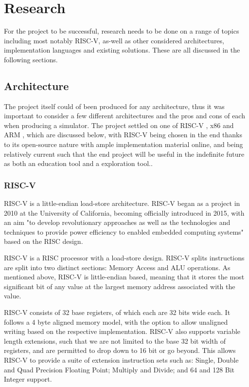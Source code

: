 \chapter{Research}
\label{ch:research}

For the project to be successful, research needs to be done on a range of topics including most notably RISC-V, as-well as other considered architectures, implementation languages and existing solutions. These are all discussed in the following sections.

\section{Architecture}
The project itself could of been produced for any architecture, thus it was important to consider a few different architectures and the pros and cons of each when producing a simulator. The project settled on one of RISC-V \cite{waterman_2019_the} , x86 \cite{intelcorporation_2023_intel} and ARM \cite{armltd_2023_defining}, which are discussed below, with RISC-V being chosen in the end thanks to its open-source nature with ample implementation material online, and being relatively current such that the end project will be useful in the indefinite future as both an education tool and a exploration tool..

\subsection{RISC-V}
RISC-V \cite{waterman_2019_the} is a little-endian load-store architecture. RISC-V began as a project in 2010 at the University of California, becoming officially introduced in 2015, with an aim "to develop revolutionary approaches as well as the technologies and techniques to provide power efficiency to enabled embedded computing systems" \cite{riscvinternational_2018_history} based on the \ac{RISC} design.

RISC-V is a \ac{RISC} processor with a load-store design. RISC-V splits instructions are split into two distinct sections: Memory Access and \ac{ALU} operations. As mentioned above, RISC-V is little-endian based, meaning that it stores the most significant bit of any value at the largest memory address associated with the value.

RISC-V consists of 32 base registers, of which each are 32 bits wide each. It follows a 4 byte aligned memory model, with the option to allow unaligned writing based on the respective implementation. RISC-V also supports variable length extensions, such that we are not limited to the base 32 bit width of registers, and are permitted to drop down to 16 bit or go beyond. This allows RISC-V to provide a suite of extension instruction sets such as: Single, Double and Quad Precision Floating Point; Multiply and Divide; and 64 and 128 Bit Integer support.

